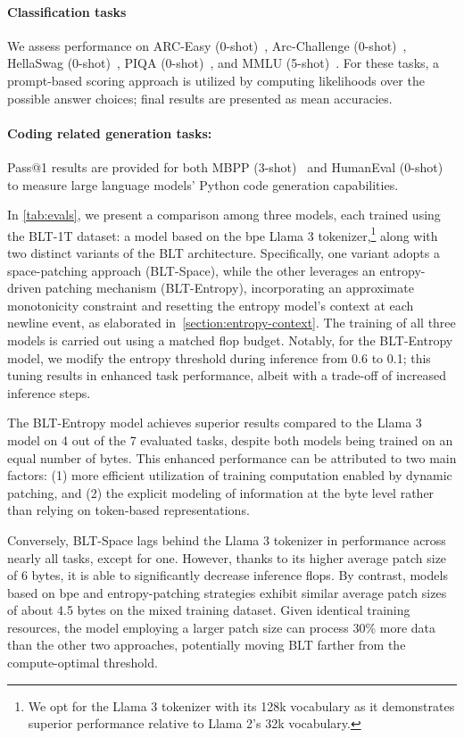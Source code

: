 \paragraph{Classification tasks} We assess performance on ARC-Easy (0-shot)~\citep{Eval_ARC}, Arc-Challenge (0-shot)~\citep{Eval_ARC}, HellaSwag (0-shot)~\citep{Eval_hellaswag}, PIQA (0-shot)~\citep{Eval_piqa}, and MMLU (5-shot)~\citep{hendrycks2020measuring}. For these tasks, a prompt-based scoring approach is utilized by computing likelihoods over the possible answer choices; final results are presented as mean accuracies.
\paragraph{Coding related generation tasks:} Pass@1 results are provided for both MBPP (3-shot)~\citep{Eval_MBPP} and HumanEval (0-shot)~\citep{Eval_HumanEval} to measure large language models’ Python code generation capabilities.

In \autoref{tab:evals}, we present a comparison among three models, each trained using the {\textsc BLT}-1T dataset: a model based on the bpe Llama 3 tokenizer,\footnote{We opt for the Llama 3 tokenizer with its 128k vocabulary as it demonstrates superior performance relative to Llama 2's 32k vocabulary.} along with two distinct variants of the {\textsc BLT} architecture. Specifically, one variant adopts a space-patching approach ({\textsc BLT}-Space), while the other leverages an entropy-driven patching mechanism ({\textsc BLT}-Entropy), incorporating an approximate monotonicity constraint and resetting the entropy model’s context at each newline event, as elaborated in~\autoref{section:entropy-context}. The training of all three models is carried out using a matched flop budget. Notably, for the {\textsc BLT}-Entropy model, we modify the entropy threshold during inference from 0.6 to 0.1; this tuning results in enhanced task performance, albeit with a trade-off of increased inference steps.

The {\textsc BLT}-Entropy model achieves superior results compared to the Llama 3 model on 4 out of the 7 evaluated tasks, despite both models being trained on an equal number of bytes. This enhanced performance can be attributed to two main factors: (1) more efficient utilization of training computation enabled by dynamic patching, and (2) the explicit modeling of information at the byte level rather than relying on token-based representations.

Conversely, {\textsc BLT}-Space lags behind the Llama 3 tokenizer in performance across nearly all tasks, except for one. However, thanks to its higher average patch size of 6 bytes, it is able to significantly decrease inference flops. By contrast, models based on bpe and entropy-patching strategies exhibit similar average patch sizes of about 4.5 bytes on the mixed training dataset. Given identical training resources, the model employing a larger patch size can process 30\% more data than the other two approaches, potentially moving {\textsc BLT} farther from the compute-optimal threshold.

